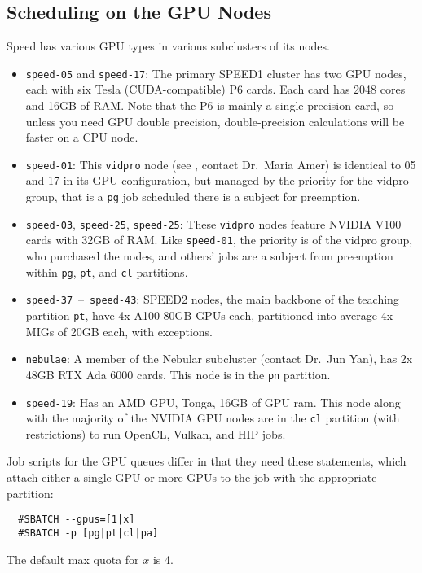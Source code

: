 \subsection{Scheduling on the GPU Nodes}
\label{sect:gpu-scheduling}

Speed has various GPU types in various subclusters of its nodes.

\begin{itemize}
	\item \texttt{speed-05} and \texttt{speed-17}:
The primary SPEED1 cluster has two GPU nodes, each with six Tesla (CUDA-compatible) P6
cards. Each card has 2048 cores and 16GB of RAM. Note that the P6
is mainly a single-precision card, so unless you need GPU double precision,
double-precision calculations will be faster on a CPU node.
	\item \texttt{speed-01}:
This \texttt{vidpro} node (see , contact Dr.~Maria Amer) is identical
to 05 and 17 in its GPU configuration, but managed by the priority
for the vidpro group, that is a \texttt{pg} job scheduled there
is a subject for preemption.
	\item \texttt{speed-03}, \texttt{speed-25}, \texttt{speed-25}:
These \texttt{vidpro} nodes feature NVIDIA V100 cards with 32GB of RAM.
Like \texttt{speed-01}, the priority is of the vidpro group, who
purchased the nodes, and others' jobs are a subject from preemption
within \texttt{pg}, \texttt{pt}, and \texttt{cl} partitions.
	\item \texttt{speed-37}~--~\texttt{speed-43}:
SPEED2 nodes, the main backbone of the teaching partition \texttt{pt},
have 4x A100 80GB GPUs each, partitioned into average 4x MIGs of 20GB
each, with exceptions.
	\item \texttt{nebulae}:
A member of the Nebular subcluster (contact Dr.~Jun Yan), has 2x 48GB
RTX Ada 6000 cards. This node is in the \texttt{pn} partition.
	\item \texttt{speed-19}:
Has an AMD GPU, Tonga, 16GB of GPU ram.
This node along with the majority of the NVIDIA GPU nodes are in the
\texttt{cl} partition (with restrictions) to run OpenCL, Vulkan,
and HIP jobs.
\end{itemize}

\noindent
Job scripts for the GPU queues differ in that they need these statements,
which attach either a single GPU or more GPUs to the job with the
appropriate partition:
\begin{verbatim}
  #SBATCH --gpus=[1|x]
  #SBATCH -p [pg|pt|cl|pa]
\end{verbatim}
The default max quota for $x$ is 4.

